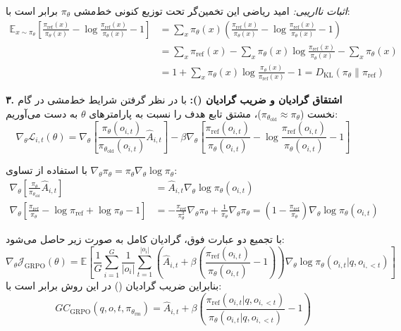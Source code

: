 \textit{اثبات نااریبی:} امید ریاضی این تخمین‌گر تحت توزیع کنونی خط‌مشی $\pi_\theta$ برابر است با:
\begin{align}
	\mathbb{E}_{x \sim \pi_\theta} \left[ \frac{\pi_{\text{ref}}(x)}{\pi_\theta(x)} - \log \frac{\pi_{\text{ref}}(x)}{\pi_\theta(x)} - 1 \right] &= \sum_x \pi_\theta(x) \left( \frac{\pi_{\text{ref}}(x)}{\pi_\theta(x)} - \log \frac{\pi_{\text{ref}}(x)}{\pi_\theta(x)} - 1 \right) \nonumber \\
	&= \sum_x \pi_{\text{ref}}(x) - \sum_x \pi_\theta(x) \log \frac{\pi_{\text{ref}}(x)}{\pi_\theta(x)} - \sum_x \pi_\theta(x) \nonumber \\
	&= 1 + \sum_x \pi_\theta(x) \log \frac{\pi_\theta(x)}{\pi_{\text{ref}}(x)} - 1 = D_{\text{KL}}(\pi_\theta \parallel \pi_{\text{ref}})
\end{align}

\textbf{۳. اشتقاق گرادیان و ضریب گرادیان ():}
با در نظر گرفتن شرایط خط‌مشی در گام نخست ($\pi_{\theta_{\text{old}}} \approx \pi_\theta$)، مشتق تابع هدف را نسبت به پارامترهای $\theta$ به دست می‌آوریم:
\begin{equation}
	\nabla_\theta \mathcal{L}_{i,t}(\theta) = \nabla_\theta \left[ \frac{\pi_\theta(o_{i,t})}{\pi_{\theta_{\text{old}}}(o_{i,t})} \hat{A}_{i,t} \right] - \beta \nabla_\theta \left[ \frac{\pi_{\text{ref}}(o_{i,t})}{\pi_\theta(o_{i,t})} - \log \frac{\pi_{\text{ref}}(o_{i,t})}{\pi_\theta(o_{i,t})} - 1 \right]
\end{equation}

با استفاده از تساوی $\nabla_\theta \pi_\theta = \pi_\theta \nabla_\theta \log \pi_\theta$:
\begin{align}
	\nabla_\theta \left[ \frac{\pi_\theta}{\pi_{\theta_{\text{old}}}} \hat{A}_{i,t} \right] &= \hat{A}_{i,t} \nabla_\theta \log \pi_\theta(o_{i,t}) \\
	\nabla_\theta \left[ \frac{\pi_{\text{ref}}}{\pi_\theta} - \log \pi_{\text{ref}} + \log \pi_\theta - 1 \right] &= -\frac{\pi_{\text{ref}}}{\pi_\theta^2} \nabla_\theta \pi_\theta + \frac{1}{\pi_\theta} \nabla_\theta \pi_\theta = \left( 1 - \frac{\pi_{\text{ref}}}{\pi_\theta} \right) \nabla_\theta \log \pi_\theta(o_{i,t})
\end{align}

با تجمیع دو عبارت فوق، گرادیان کامل به صورت زیر حاصل می‌شود:
\begin{equation}
	\nabla_\theta \mathcal{J}_{\text{GRPO}}(\theta) = \mathbb{E} \left[ \frac{1}{G} \sum_{i=1}^G \frac{1}{|o_i|} \sum_{t=1}^{|o_i|} \left( \hat{A}_{i,t} + \beta \left( \frac{\pi_{\text{ref}}(o_{i,t})}{\pi_\theta(o_{i,t})} - 1 \right) \right) \nabla_\theta \log \pi_\theta(o_{i,t}|q, o_{i,<t}) \right]
\end{equation}
بنابراین ضریب گرادیان () در این روش برابر است با:
\begin{equation}
	GC_{\text{GRPO}}(q, o, t, \pi_{\theta_{\text{rm}}}) = \hat{A}_{i,t} + \beta \left( \frac{\pi_{\text{ref}}(o_{i,t}|q, o_{i,<t})}{\pi_\theta(o_{i,t}|q, o_{i,<t})} - 1 \right)
\end{equation}


